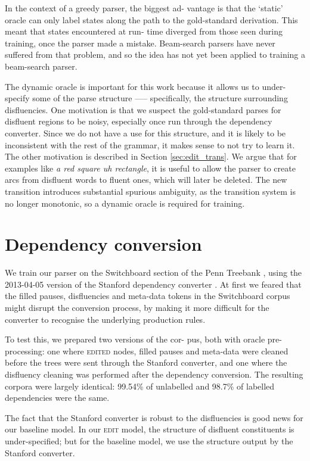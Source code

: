 \documentclass[11pt,letterpaper]{article}
\begin{document}
In the context of a greedy parser, the biggest ad- vantage is that the `static'
oracle can only label states along the path to the gold-standard derivation.
This meant that states encountered at run- time diverged from those seen during
training, once the parser made a mistake. Beam-search parsers have never suffered
from that problem, and so the idea has not yet been applied to training a beam-search
parser.

The dynamic oracle is important for this work because it allows us to under-specify
some of the parse structure —-- specifically, the structure surrounding disfluencies.
One motivation is that we suspect the gold-standard parses for disfluent regions
to be noisy, especially once run through the dependency converter. Since we do
not have a use for this structure, and it is likely to be inconsistent with the
rest of the grammar, it makes sense to not try to learn it. The other motivation
is described in Section \ref{sec:edit_trans}. We argue that for examples like
\emph{a red square uh rectangle}, it is useful to allow the parser to create arcs
from disfluent words to fluent ones, which will later be deleted. The new
transition introduces substantial spurious ambiguity, as the transition system
is no longer monotonic, so a dynamic oracle is required for training.

\section{Dependency conversion}

We train our parser on the Switchboard section of the Penn Treebank \citep{marcus:93},
using the 2013-04-05 version of the Stanford dependency converter \citep{stanford_deps}.
At first we feared that the filled pauses, disfluencies and meta-data tokens in
the Switchboard corpus might disrupt the conversion process, by making it more
difficult for the converter to recognise the underlying production rules.

To test this, we prepared two versions of the cor- pus, both with oracle pre-processing:
one where \textsc{edited} nodes, filled pauses and meta-data were cleaned before
the trees were sent through the Stanford converter, and one where the disfluency
cleaning was performed after the dependency conversion. The resulting corpora
were largely identical: 99.54\% of unlabelled and 98.7\% of labelled dependencies
were the same.

The fact that the Stanford converter is robust to the disfluencies is good news
for our baseline model. In our \textsc{edit} model, the structure of disfluent
constituents is under-specified; but for the baseline model, we use the structure
output by the Stanford converter.
\end{document}
